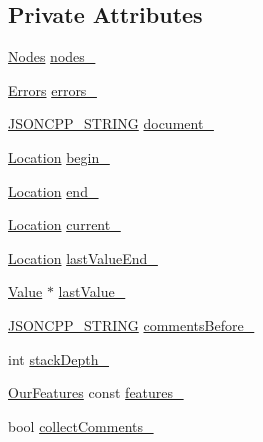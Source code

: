 \subsection*{Private Attributes}
\begin{DoxyCompactItemize}
\item 
\hyperlink{class_json_1_1_our_reader_a8480a5ef159cee3a090f96358414d8d3}{Nodes} \hyperlink{class_json_1_1_our_reader_a19cc4e8c5d17ee6822f752e9a36f4ce3}{nodes\+\_\+}
\item 
\hyperlink{class_json_1_1_our_reader_a8cc69593ef7303e58e99bb5dbb767562}{Errors} \hyperlink{class_json_1_1_our_reader_afb76b68ba1ab68fe09cf2838e3d4898d}{errors\+\_\+}
\item 
\hyperlink{config_8h_a1e723f95759de062585bc4a8fd3fa4be}{J\+S\+O\+N\+C\+P\+P\+\_\+\+S\+T\+R\+I\+NG} \hyperlink{class_json_1_1_our_reader_a726230af83d22d25e0c76cec3408ecf1}{document\+\_\+}
\item 
\hyperlink{class_json_1_1_our_reader_a1bdc7bbc52ba87cae6b19746f2ee0189}{Location} \hyperlink{class_json_1_1_our_reader_a9bda9d72335d52cd06e65f9eca3f70f5}{begin\+\_\+}
\item 
\hyperlink{class_json_1_1_our_reader_a1bdc7bbc52ba87cae6b19746f2ee0189}{Location} \hyperlink{class_json_1_1_our_reader_ab1f69b0260c27a0d2d65dc56e42c8f9d}{end\+\_\+}
\item 
\hyperlink{class_json_1_1_our_reader_a1bdc7bbc52ba87cae6b19746f2ee0189}{Location} \hyperlink{class_json_1_1_our_reader_a5211fbbba94be80a22dd2317c621efcc}{current\+\_\+}
\item 
\hyperlink{class_json_1_1_our_reader_a1bdc7bbc52ba87cae6b19746f2ee0189}{Location} \hyperlink{class_json_1_1_our_reader_a101eadc45e01c60628b53f0db3d13482}{last\+Value\+End\+\_\+}
\item 
\hyperlink{class_json_1_1_value}{Value} $\ast$ \hyperlink{class_json_1_1_our_reader_a9f994b6a2227c5d96e6ed6cbc74ed251}{last\+Value\+\_\+}
\item 
\hyperlink{config_8h_a1e723f95759de062585bc4a8fd3fa4be}{J\+S\+O\+N\+C\+P\+P\+\_\+\+S\+T\+R\+I\+NG} \hyperlink{class_json_1_1_our_reader_a9c53e77e290eb9081298210a955fda6a}{comments\+Before\+\_\+}
\item 
int \hyperlink{class_json_1_1_our_reader_aaa91c93bc064c7086248ea01eddcf51a}{stack\+Depth\+\_\+}
\item 
\hyperlink{class_json_1_1_our_features}{Our\+Features} const \hyperlink{class_json_1_1_our_reader_a2714302d5cc54ca2ce4118ea51c0397a}{features\+\_\+}
\item 
bool \hyperlink{class_json_1_1_our_reader_a259f6ac988da2894bcafc670e42f73ad}{collect\+Comments\+\_\+}
\end{DoxyCompactItemize}


